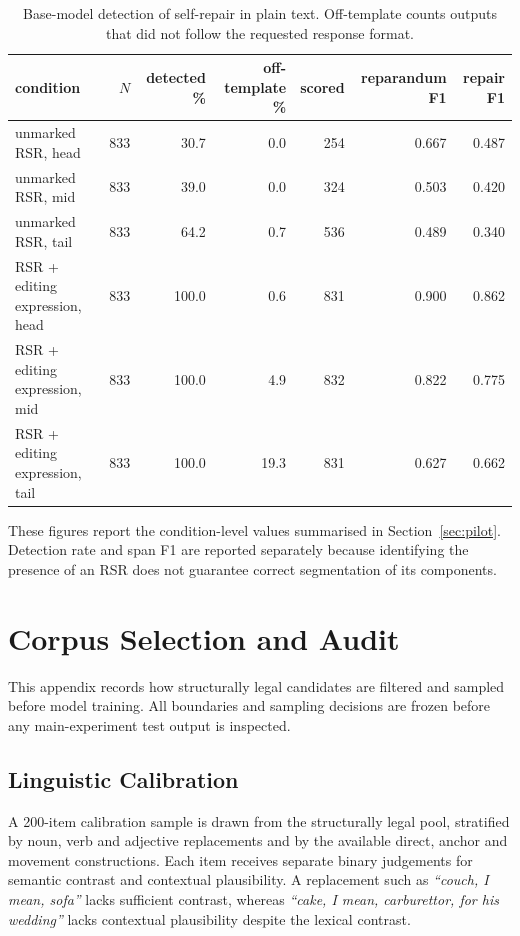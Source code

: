 \begin{table}[ht]
\centering
\small
\begin{tabular}{lrrrrrr}
\toprule
condition & $N$ & detected \% & off-template \% & scored & reparandum F1 & repair F1 \\
\midrule
unmarked RSR, head          & 833 & 30.7 &  0.0 & 254 & 0.667 & 0.487 \\
unmarked RSR, mid           & 833 & 39.0 &  0.0 & 324 & 0.503 & 0.420 \\
unmarked RSR, tail          & 833 & 64.2 &  0.7 & 536 & 0.489 & 0.340 \\
\addlinespace
RSR + editing expression, head & 833 & 100.0 &  0.6 & 831 & 0.900 & 0.862 \\
RSR + editing expression, mid  & 833 & 100.0 &  4.9 & 832 & 0.822 & 0.775 \\
RSR + editing expression, tail & 833 & 100.0 & 19.3 & 831 & 0.627 & 0.662 \\
\bottomrule
\end{tabular}
\caption{Base-model detection of self-repair in plain text. Off-template counts
outputs that did not follow the requested response format.}
\label{tab:ablation}
\end{table}

These figures report the condition-level values summarised in
Section~\ref{sec:pilot}. Detection rate and span F1 are reported separately
because identifying the presence of an RSR does not guarantee correct
segmentation of its components.

\section{Corpus Selection and Audit}
\label{app:corpus-selection}

This appendix records how structurally legal candidates are filtered and
sampled before model training. All boundaries and sampling decisions are
frozen before any main-experiment test output is inspected.

\subsection{Linguistic Calibration}

A 200-item calibration sample is drawn from the structurally legal pool,
stratified by noun, verb and adjective replacements and by the available
direct, anchor and movement constructions. Each item receives separate binary
judgements for semantic contrast and contextual plausibility. A replacement
such as \textit{``couch, I mean, sofa''} lacks sufficient contrast, whereas
\textit{``cake, I mean, carburettor, for his wedding''} lacks contextual
plausibility despite the lexical contrast.

